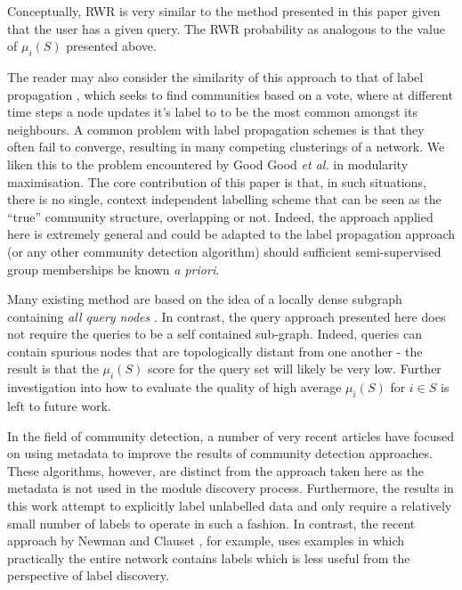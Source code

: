 \documentclass[sigconf]{acmart}
\begin{document}
Conceptually, RWR is very similar to the method presented in this paper given that the user has a given query.
The RWR probability as analogous to the value of $\mu_i(S)$ presented above.

The reader may also consider the similarity of this approach to that of label propagation \cite{raghavan2007near, gregory2010finding}, which seeks to find communities based on a vote, where at different time steps a node updates it's label to to be the most common amongst its neighbours.
A common problem with label propagation schemes is that they often fail to converge, resulting in many competing clusterings of a network.
We liken this to the problem encountered by Good Good \textit{et al.} \cite{good2010performance} in modularity maximisation.
The core contribution of this paper is that, in such situations, there is no single, context independent labelling scheme that can be seen as the ``true'' community structure, overlapping or not.
Indeed, the approach applied here is extremely general and could be adapted to the label propagation approach (or any other community detection algorithm) should sufficient semi-supervised group memberships be known \textit{a priori}.

Many existing method are based on the idea of a locally dense subgraph containing \textit{all query nodes} \cite{benson2016higher}.
In contrast, the query approach presented here does not require the queries to be a self contained sub-graph.
Indeed, queries can contain spurious nodes that are topologically distant from one another - the result is that the $\mu_i(S)$ score for the query set will likely be very low.
Further investigation into how to evaluate the quality of high average $\mu_i(S)$ for $i \in S$ is left to future work.

In the field of community detection, a number of very recent articles have focused on using metadata to improve the results of community detection approaches.
These algorithms, however, are distinct from the approach taken here as the metadata is not used in the module discovery process.
Furthermore, the results in this work attempt to explicitly label unlabelled data and only require a relatively small number of labels to operate in such a fashion.
In contrast,  the recent approach by Newman and Clauset \cite{newman2016structure}, for example, uses examples in which practically the entire network contains labels which is less useful from the perspective of label discovery.
\end{document}
